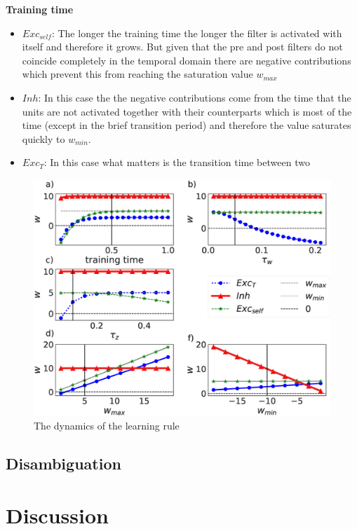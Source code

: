 \documentclass{esannV2}
\begin{document}
\textbf{Training time}
\begin{itemize}
\item  $Exc_{self}$: The longer the training time the longer the filter is activated with itself and therefore it grows. But given that the pre and post filters do not coincide completely in the temporal domain there are negative contributions which prevent this from reaching the saturation value $w_{max}$
\item  $Inh$: In this case the the negative contributions come from the time that the units are not activated together with their counterparts which is most of the time (except in the brief transition period) and therefore the value saturates quickly to $w_{min}$.
\item $Exc_{T}$: In this case what matters is the transition time between two 
\end{itemize} 


\begin{figure}[h!]
\centering
\includegraphics[scale=0.3]{training_rule_quantities_pre_rule_False.eps}
\caption{The dynamics of the learning rule}\label{Fig:learning_quantities_post}
\end{figure}

 
\subsection{Disambiguation}


\section{Discussion}
\end{document}
